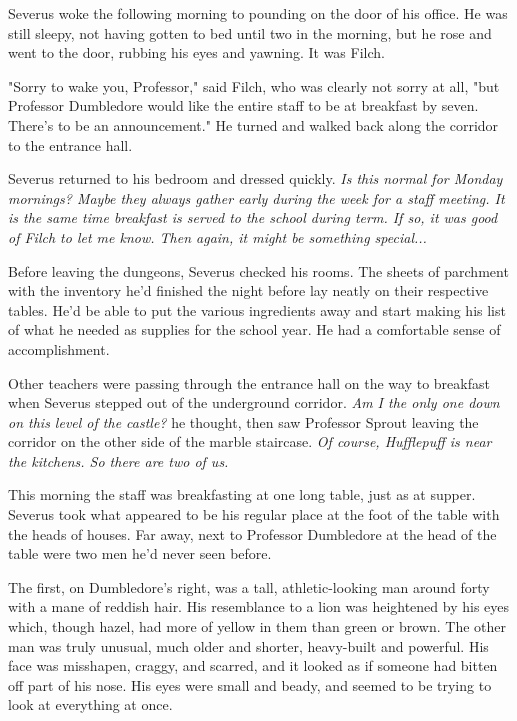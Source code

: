 \documentclass[a4paper,11pt]{article}
\begin{document}
Severus woke the following morning to pounding on the door of his office. He was still sleepy, not having gotten to bed until two in the morning, but he rose and went to the door, rubbing his eyes and yawning. It was Filch.

"Sorry to wake you, Professor," said Filch, who was clearly not sorry at all, "but Professor Dumbledore would like the entire staff to be at breakfast by seven. There's to be an announcement." He turned and walked back along the corridor to the entrance hall.

Severus returned to his bedroom and dressed quickly. \emph{Is this normal for Monday mornings? Maybe they always gather early during the week for a staff meeting. It is the same time breakfast is served to the school during term. If so, it was good of Filch to let me know. Then again, it might be something special...}

Before leaving the dungeons, Severus checked his rooms. The sheets of parchment with the inventory he'd finished the night before lay neatly on their respective tables. He'd be able to put the various ingredients away and start making his list of what he needed as supplies for the school year. He had a comfortable sense of accomplishment.

Other teachers were passing through the entrance hall on the way to breakfast when Severus stepped out of the underground corridor. \emph{Am I the only one down on this level of the castle?} he thought, then saw Professor Sprout leaving the corridor on the other side of the marble staircase. \emph{Of course, Hufflepuff is near the kitchens. So there are two of us.}

This morning the staff was breakfasting at one long table, just as at supper. Severus took what appeared to be his regular place at the foot of the table with the heads of houses. Far away, next to Professor Dumbledore at the head of the table were two men he'd never seen before.

The first, on Dumbledore's right, was a tall, athletic-looking man around forty with a mane of reddish hair. His resemblance to a lion was heightened by his eyes which, though hazel, had more of yellow in them than green or brown. The other man was truly unusual, much older and shorter, heavy-built and powerful. His face was misshapen, craggy, and scarred, and it looked as if someone had bitten off part of his nose. His eyes were small and beady, and seemed to be trying to look at everything at once.
\end{document}
